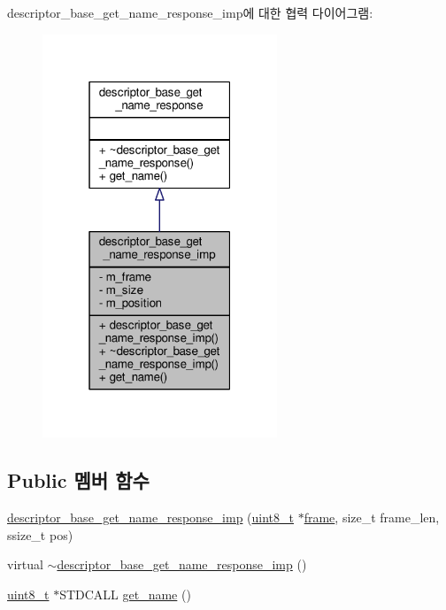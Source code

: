 descriptor\+\_\+base\+\_\+get\+\_\+name\+\_\+response\+\_\+imp에 대한 협력 다이어그램\+:
\nopagebreak
\begin{figure}[H]
\begin{center}
\leavevmode
\includegraphics[width=199pt]{classavdecc__lib_1_1descriptor__base__get__name__response__imp__coll__graph}
\end{center}
\end{figure}
\subsection*{Public 멤버 함수}
\begin{DoxyCompactItemize}
\item 
\hyperlink{classavdecc__lib_1_1descriptor__base__get__name__response__imp_ab4584040e29cfdbb0535252a460a5e06}{descriptor\+\_\+base\+\_\+get\+\_\+name\+\_\+response\+\_\+imp} (\hyperlink{stdint_8h_aba7bc1797add20fe3efdf37ced1182c5}{uint8\+\_\+t} $\ast$\hyperlink{gst__avb__playbin_8c_ac8e710e0b5e994c0545d75d69868c6f0}{frame}, size\+\_\+t frame\+\_\+len, ssize\+\_\+t pos)
\item 
virtual \hyperlink{classavdecc__lib_1_1descriptor__base__get__name__response__imp_a142fd2da9d3f5920422ecec67801e3b1}{$\sim$descriptor\+\_\+base\+\_\+get\+\_\+name\+\_\+response\+\_\+imp} ()
\item 
\hyperlink{stdint_8h_aba7bc1797add20fe3efdf37ced1182c5}{uint8\+\_\+t} $\ast$S\+T\+D\+C\+A\+LL \hyperlink{classavdecc__lib_1_1descriptor__base__get__name__response__imp_ae42f1e9a1cbc35a08f389805a8180e92}{get\+\_\+name} ()
\end{DoxyCompactItemize}
